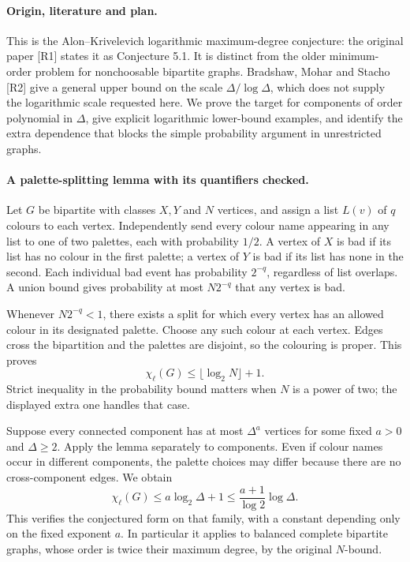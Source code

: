 \documentclass[11pt,a4paper]{article}
\begin{document}
\paragraph{Origin, literature and plan.}
This is the Alon--Krivelevich logarithmic maximum-degree conjecture:
the original paper [R1] states it as Conjecture 5.1. It is distinct
from the older minimum-order problem for nonchoosable bipartite graphs.
Bradshaw, Mohar and Stacho [R2] give a general upper bound on the
scale $\Delta/\log\Delta$, which does not supply the logarithmic
scale requested here. We prove the target for components of order
polynomial in $\Delta$, give explicit logarithmic lower-bound examples,
and identify the extra dependence that blocks the simple probability
argument in unrestricted graphs.

\paragraph{A palette-splitting lemma with its quantifiers checked.}
Let $G$ be bipartite with classes $X,Y$ and $N$ vertices, and assign
a list $L(v)$ of $q$ colours to each vertex. Independently send every
colour name appearing in any list to one of two palettes, each with
probability $1/2$. A vertex of $X$ is bad if its list has no colour
in the first palette; a vertex of $Y$ is bad if its list has none
in the second. Each individual bad event has probability $2^{-q}$,
regardless of list overlaps. A union bound gives probability at most
$N2^{-q}$ that any vertex is bad.

Whenever $N2^{-q}<1$, there exists a split for which every vertex
has an allowed colour in its designated palette. Choose any such
colour at each vertex. Edges cross the bipartition and the palettes
are disjoint, so the colouring is proper. This proves
\[
 \chi_\ell(G)\le\lfloor\log_2N\rfloor+1.
\]
Strict inequality in the probability bound matters when $N$ is a
power of two; the displayed extra one handles that case.

Suppose every connected component has at most $\Delta^a$ vertices
for some fixed $a>0$ and $\Delta\ge2$. Apply the lemma separately
to components. Even if colour names occur in different components,
the palette choices may differ because there are no cross-component
edges. We obtain
\[
 \chi_\ell(G)\le a\log_2\Delta+1
 \le\frac{a+1}{\log2}\log\Delta.
\]
This verifies the conjectured form on that family, with a constant
depending only on the fixed exponent $a$. In particular it applies
to balanced complete bipartite graphs, whose order is twice their
maximum degree, by the original $N$-bound.
\end{document}
